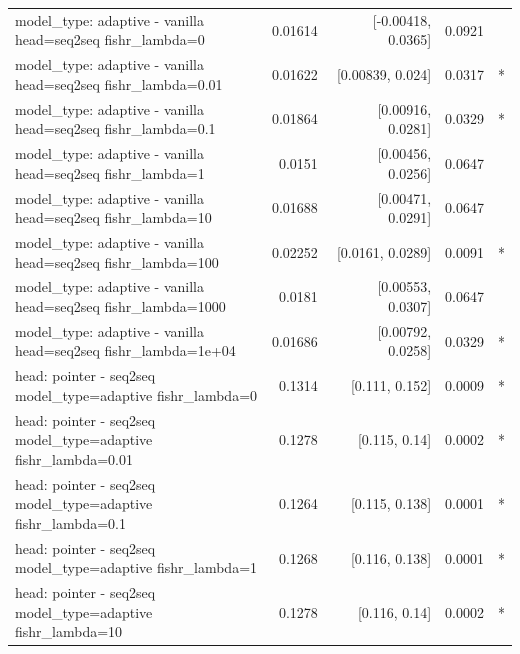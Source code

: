 \documentclass[10pt]{article}
\makeatletter
\newcommand{\stackcell}[1]{\begin{tabular}[t]{@{}l@{}}#1\end{tabular}}
\makeatother
\begin{document}
{\begin{longtable}{lrrrl}
\stackcell{model\_type: adaptive - vanilla\\\footnotesize head=seq2seq fishr\_lambda=0 } & 0.01614 & [-0.00418, 0.0365] & 0.0921 & \\
\stackcell{model\_type: adaptive - vanilla\\\footnotesize head=seq2seq fishr\_lambda=0.01 } & 0.01622 & [0.00839, 0.024] & 0.0317 & *\\
\stackcell{model\_type: adaptive - vanilla\\\footnotesize head=seq2seq fishr\_lambda=0.1 } & 0.01864 & [0.00916, 0.0281] & 0.0329 & *\\
\stackcell{model\_type: adaptive - vanilla\\\footnotesize head=seq2seq fishr\_lambda=1 } & 0.0151 & [0.00456, 0.0256] & 0.0647 & \\
\stackcell{model\_type: adaptive - vanilla\\\footnotesize head=seq2seq fishr\_lambda=10 } & 0.01688 & [0.00471, 0.0291] & 0.0647 & \\
\stackcell{model\_type: adaptive - vanilla\\\footnotesize head=seq2seq fishr\_lambda=100 } & 0.02252 & [0.0161, 0.0289] & 0.0091 & *\\
\stackcell{model\_type: adaptive - vanilla\\\footnotesize head=seq2seq fishr\_lambda=1000 } & 0.0181 & [0.00553, 0.0307] & 0.0647 & \\
\stackcell{model\_type: adaptive - vanilla\\\footnotesize head=seq2seq fishr\_lambda=1e+04 } & 0.01686 & [0.00792, 0.0258] & 0.0329 & *\\
\stackcell{head: pointer - seq2seq\\\footnotesize model\_type=adaptive fishr\_lambda=0 } & 0.1314 & [0.111, 0.152] & 0.0009 & *\\
\stackcell{head: pointer - seq2seq\\\footnotesize model\_type=adaptive fishr\_lambda=0.01 } & 0.1278 & [0.115, 0.14] & 0.0002 & *\\
\stackcell{head: pointer - seq2seq\\\footnotesize model\_type=adaptive fishr\_lambda=0.1 } & 0.1264 & [0.115, 0.138] & 0.0001 & *\\
\stackcell{head: pointer - seq2seq\\\footnotesize model\_type=adaptive fishr\_lambda=1 } & 0.1268 & [0.116, 0.138] & 0.0001 & *\\
\stackcell{head: pointer - seq2seq\\\footnotesize model\_type=adaptive fishr\_lambda=10 } & 0.1278 & [0.116, 0.14] & 0.0002 & *\\

\end{longtable}}
\end{document}
